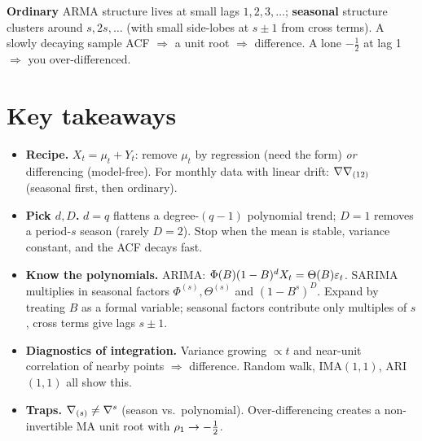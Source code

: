 \documentclass[11pt]{article}
\begin{document}
\begin{intu}
\textbf{Ordinary} ARMA structure lives at small lags $1,2,3,\dots$; \textbf{seasonal} structure clusters around $s,2s,\dots$ (with small side-lobes at $s\pm1$ from cross terms). A slowly decaying sample ACF $\Rightarrow$ a unit root $\Rightarrow$ difference. A lone $-\tfrac12$ at lag 1 $\Rightarrow$ you over-differenced.
\end{intu}

\section*{Key takeaways}

\begin{retenir}
\begin{itemize}
\item \textbf{Recipe.} $X_t=\mu_t+Y_t$: remove $\mu_t$ by regression (need the form) \emph{or} differencing (model-free). For monthly data with linear drift: $\nabla\nabla_{(12)}$ (seasonal first, then ordinary).
\item \textbf{Pick $d,D$.} $d=q$ flattens a degree-$(q-1)$ polynomial trend; $D=1$ removes a period-$s$ season (rarely $D=2$). Stop when the mean is stable, variance constant, and the ACF decays fast.
\item \textbf{Know the polynomials.} ARIMA: $\Phi(B)(1-B)^{d}X_t=\Theta(B)\varepsilon_t$. SARIMA multiplies in seasonal factors $\Phi^{(s)},\Theta^{(s)}$ and $(1-B^{s})^{D}$. Expand by treating $B$ as a formal variable; seasonal factors contribute only multiples of $s$, cross terms give lags $s\pm1$.
\item \textbf{Diagnostics of integration.} Variance growing $\propto t$ and near-unit correlation of nearby points $\Rightarrow$ difference. Random walk, IMA$(1,1)$, ARI$(1,1)$ all show this.
\item \textbf{Traps.} $\nabla_{(s)}\neq\nabla^{s}$ (season vs.\ polynomial). Over-differencing creates a non-invertible MA unit root with $\rho_1\to-\tfrac12$.
\end{itemize}
\end{retenir}
\end{document}

